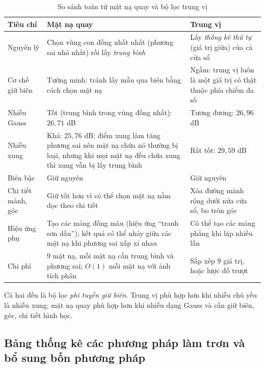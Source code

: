 \begin{table}[ht]
\centering
\scriptsize
\caption{So sánh toán tử mặt nạ quay và bộ lọc trung vị}
\label{tab:w6_rot_vs_median}
\renewcommand{\arraystretch}{1.3}
\begin{tabularx}{\textwidth}{|p{2.3cm}|X|X|}
\hline
\textbf{Tiêu chí} & \textbf{Mặt nạ quay} & \textbf{Trung vị} \\
\hline
Nguyên lý & Chọn vùng con đồng nhất nhất (phương sai nhỏ nhất) rồi lấy \emph{trung bình} & Lấy \emph{thống kê thứ tự} (giá trị giữa) của cả cửa sổ \\
\hline
Cơ chế giữ biên & Tường minh: tránh lấy mẫu qua biên bằng cách chọn mặt nạ & Ngầm: trung vị luôn là một giá trị có thật thuộc phía chiếm đa số \\
\hline
Nhiễu Gauss & Tốt (trung bình trong vùng đồng nhất): $26{,}71$ dB & Tương đương: $26{,}96$ dB \\
\hline
Nhiễu xung & Khá: $25{,}76$ dB; điểm xung làm tăng phương sai nên mặt nạ chứa nó thường bị loại, nhưng khi mọi mặt nạ đều chứa xung thì xung vẫn bị lấy trung bình & Rất tốt: $29{,}59$ dB \\
\hline
Biên bậc & Giữ nguyên & Giữ nguyên \\
\hline
Chi tiết mảnh, góc & Giữ tốt hơn vì có thể chọn mặt nạ nằm dọc theo chi tiết & Xóa đường mảnh rộng dưới nửa cửa sổ, bo tròn góc \\
\hline
Hiệu ứng phụ & Tạo các mảng đồng màu (hiệu ứng ``tranh sơn dầu''); kết quả có thể nhảy giữa các mặt nạ khi phương sai xấp xỉ nhau & Có thể tạo các mảng phẳng khi lặp nhiều lần \\
\hline
Chi phí & $9$ mặt nạ, mỗi mặt nạ cần trung bình và phương sai; $O(1)$ mỗi mặt nạ với ảnh tích phân & Sắp xếp $9$ giá trị, hoặc lược đồ trượt \\
\hline
\end{tabularx}
\end{table}

Cả hai đều là bộ lọc \emph{phi tuyến giữ biên}. Trung vị phù hợp hơn khi nhiễu chủ yếu là nhiễu xung; mặt nạ quay phù hợp hơn khi nhiễu dạng Gauss và cần giữ biên, góc, chi tiết hình học.

\subsection{Bảng thống kê các phương pháp làm trơn và bổ sung bốn phương pháp}
\label{subsec:w6_smoothing_table}

